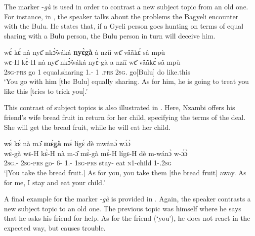 The marker -{\itshape gà} is used in order to contrast a new subject topic from an old one. For instance, in , the speaker talks about the problems the Bagyeli encounter with the Bulu. He states that, if a Gyeli person goes hunting on terms of equal sharing with a Bulu person, the Bulu person in turn will deceive him.

\ea \label{ga1}
  \glll wɛ́ kɛ́ nà nyɛ̂ nkɔ̃̀wáká {\bfseries nyɛ̀gà} à nzíí wɛ̂ vã́ã̀kɛ́ sâ mpù \\
         wɛ-H kɛ̀-H nà nyɛ̂ nkɔ̃̀wáká nyɛ̀-gà a nzíí wɛ̂ vã́ã̀kɛ́ sâ mpù \\
         2\textsc{sg}-\textsc{prs} go {\COM} 1 equal.sharing 1.{\SBJ}-{\CONTR} 1 {\PROG}.\textsc{prs} 2\textsc{sg}.{\OBJ} go[Bulu] do like.this\\
    \trans `You go with him [the Bulu] equally sharing. As for him, he is going to treat you like this [tries to trick you].'
\z

This contrast of subject topics is also illustrated in . Here, Nzambi offers his friend's wife bread fruit in return for her child, specifying the terms of the deal. She will get the bread fruit, while he will eat her child.

\ea \label{ga2} 
   wɛ́ kɛ́ nà mɔ̂ {\bfseries mɛ̀gà} mɛ́ lígɛ́ dè mwánɔ̀ wɔ́ɔ̀\\
       wɛ̀-gà wɛ-H kɛ̀-H nà m-ɔ̂ mɛ̀-gà mɛ̀-H lígɛ-H dè m-wánɔ̀ w-ɔ́ɔ̀\\
         2\textsc{sg}.{\SBJ}-{\CONTR} 2\textsc{sg}-\textsc{prs} go-{\R} {\COM} 6-{\OBJ} 1.{\SBJ}-{\CONTR} 1\textsc{sg}-\textsc{prs} stay-{\R} eat \textsc{n}1-child 1-{\POSS}.2\textsc{sg}\\
    \trans `[You take the bread fruit.] As for you, you take them [the bread fruit] away. As for me, I stay and eat your child.'
\z



A final example for the marker -{\itshape gà} is provided in . Again, the speaker contrasts a new subject topic to an old one. The previous topic was himself where he says that he asks his friend for help. As for the friend (`you'), he does not react in the expected way, but causes trouble.

